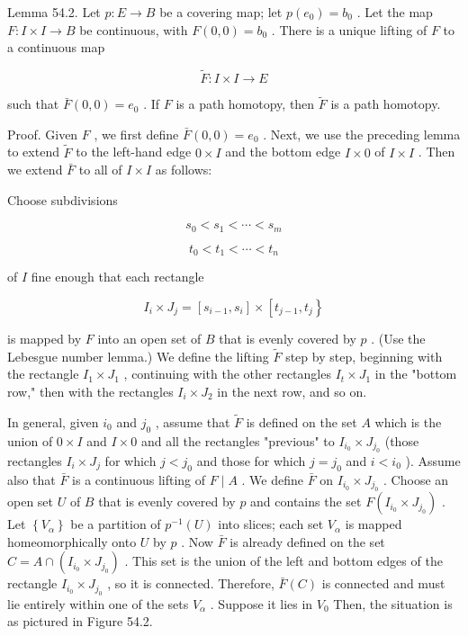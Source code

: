 \documentclass[10pt]{article}
\begin{document}
Lemma 54.2. Let \(p : E \rightarrow  B\) be a covering map; let \(p\left( {e}_{0}\right)  = {b}_{0}\) . Let the map \(F : I \times  I \rightarrow  B\) be continuous, with \(F\left( {0,0}\right)  = {b}_{0}\) . There is a unique lifting of \(F\) to a continuous map

\[
\widetilde{F} : I \times  I \rightarrow  E
\]

such that \(\bar{F}\left( {0,0}\right)  = {e}_{0}\) . If \(F\) is a path homotopy, then \(\widetilde{F}\) is a path homotopy.

Proof. Given \(F\) , we first define \(\bar{F}\left( {0,0}\right)  = {e}_{0}\) . Next, we use the preceding lemma to extend \(\widetilde{F}\) to the left-hand edge \(0 \times  I\) and the bottom edge \(I \times  0\) of \(I \times  I\) . Then we extend \(\bar{F}\) to all of \(I \times  I\) as follows:

Choose subdivisions

\[
{s}_{0} < {s}_{1} < \cdots  < {s}_{m}
\]

\[
{t}_{0} < {t}_{1} < \cdots  < {t}_{n}
\]

of \(I\) fine enough that each rectangle

\[
{I}_{i} \times  {J}_{j} = \left\lbrack  {{s}_{i - 1},{s}_{i}}\right\rbrack   \times  \left\lbrack  {{t}_{j - 1},{t}_{j}}\right\}
\]

is mapped by \(F\) into an open set of \(B\) that is evenly covered by \(p\) . (Use the Lebesgue number lemma.) We define the lifting \(\widetilde{F}\) step by step, beginning with the rectangle \({I}_{1} \times  {J}_{1}\) , continuing with the other rectangles \({I}_{t} \times  {J}_{1}\) in the "bottom row," then with the rectangles \({I}_{i} \times  {J}_{2}\) in the next row, and so on.

In general, given \({i}_{0}\) and \({j}_{0}\) , assume that \(\widetilde{F}\) is defined on the set \(A\) which is the union of \(0 \times  I\) and \(I \times  0\) and all the rectangles "previous" to \({I}_{{i}_{0}} \times  {J}_{{j}_{0}}\) (those rectangles \({I}_{i} \times  {J}_{j}\) for which \(j < {j}_{0}\) and those for which \(j = {j}_{0}\) and \(i < {i}_{0}\) ). Assume also that \(\bar{F}\) is a continuous lifting of \(F \mid  A\) . We define \(\bar{F}\) on \({I}_{{i}_{0}} \times  {J}_{{j}_{0}}\) . Choose an open set \(U\) of \(B\) that is evenly covered by \(p\) and contains the set \(F\left( {{I}_{{i}_{0}} \times  {J}_{{j}_{0}}}\right)\) . Let \(\left\{  {V}_{\alpha }\right\}\) be a partition of \({p}^{-1}\left( U\right)\) into slices; each set \({V}_{\alpha }\) is mapped homeomorphically onto \(U\) by \(p\) . Now \(\bar{F}\) is already defined on the set \(C = A \cap  \left( {{I}_{{i}_{0}} \times  {J}_{{j}_{0}}}\right)\) . This set is the union of the left and bottom edges of the rectangle \({I}_{{i}_{0}} \times  {J}_{{j}_{0}}\) , so it is connected. Therefore, \(\bar{F}\left( C\right)\) is connected and must lie entirely within one of the sets \({V}_{\alpha }\) . Suppose it lies in \({V}_{0}\) Then, the situation is as pictured in Figure 54.2.
\end{document}
